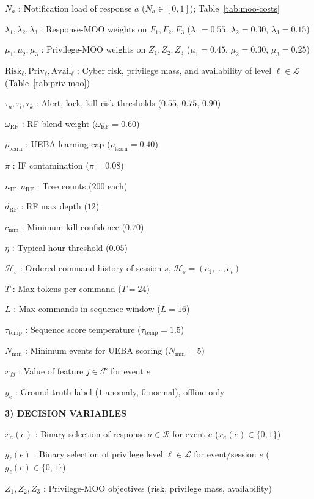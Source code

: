 \documentclass{ieeeaccess}
\begin{document}
$N_a$ : \textbf{N}otification load of response $a$ ($N_a\in[0,1]$); Table~\ref{tab:moo-costs}

$\lambda_1,\lambda_2,\lambda_3$ : Response-MOO weights on $F_1,F_2,F_3$ ($\lambda_1{=}0.55$, $\lambda_2{=}0.30$, $\lambda_3{=}0.15$)

$\mu_1,\mu_2,\mu_3$ : Privilege-MOO weights on $Z_1,Z_2,Z_3$ ($\mu_1{=}0.45$, $\mu_2{=}0.30$, $\mu_3{=}0.25$)

$\mathrm{Risk}_{\ell},\mathrm{Priv}_{\ell},\mathrm{Avail}_{\ell}$ : Cyber risk, privilege mass, and availability of level $\ell\in\mathcal{L}$ (Table~\ref{tab:priv-moo})

$\tau_a,\tau_l,\tau_k$ : Alert, lock, kill risk thresholds ($0.55$, $0.75$, $0.90$)

$\omega_{\mathrm{RF}}$ : RF blend weight ($\omega_{\mathrm{RF}}=0.60$)

$\rho_{\mathrm{learn}}$ : UEBA learning cap ($\rho_{\mathrm{learn}}=0.40$)

$\pi$ : IF contamination ($\pi=0.08$)

$n_{\mathrm{IF}},n_{\mathrm{RF}}$ : Tree counts ($200$ each)

$d_{\mathrm{RF}}$ : RF max depth ($12$)

$c_{\min}$ : Minimum kill confidence ($0.70$)

$\eta$ : Typical-hour threshold ($0.05$)

$\mathcal{H}_s$ : Ordered command history of session $s$, $\mathcal{H}_s=(c_1,\ldots,c_t)$

$T$ : Max tokens per command ($T{=}24$)

$L$ : Max commands in sequence window ($L{=}16$)

$\tau_{\mathrm{temp}}$ : Sequence score temperature ($\tau_{\mathrm{temp}}{=}1.5$)

$N_{\min}$ : Minimum events for UEBA scoring ($N_{\min}=5$)

$x_{fj}$ : Value of feature $j\in\mathcal{F}$ for event $e$

$y_e$ : Ground-truth label ($1$ anomaly, $0$ normal), offline only

\textbf{3) DECISION VARIABLES}

$x_a(e)$ : Binary selection of response $a\in\mathcal{R}$ for event $e$ ($x_a(e)\in\{0,1\}$)

$y_{\ell}(e)$ : Binary selection of privilege level $\ell\in\mathcal{L}$ for event/session $e$ ($y_{\ell}(e)\in\{0,1\}$)

$Z_1,Z_2,Z_3$ : Privilege-MOO objectives (risk, privilege mass, availability)
\end{document}
